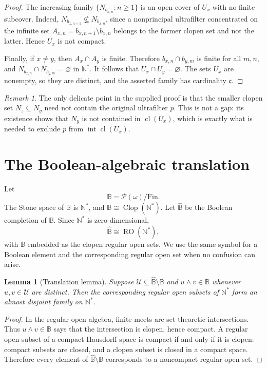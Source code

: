 \documentclass[11pt]{article}
\newtheorem{lemma}[theorem]{Lemma}
\theoremstyle{definition}
\theoremstyle{remark}
\newtheorem{remark}[theorem]{Remark}
\newcommand{\B}{\mathbb B}
\newcommand{\wideB}{\widehat{\mathbb B}}
\newcommand{\Fin}{\mathrm{Fin}}
\newcommand{\RO}{\operatorname{RO}}
\newcommand{\Clop}{\operatorname{Clop}}
\newcommand{\Int}{\operatorname{int}}
\newcommand{\cl}{\operatorname{cl}}
\newcommand{\calU}{\mathcal U}
\begin{document}
\begin{proof}
The increasing family \(\{N_{b_{x,n}}:n\geq1\}\) is an open cover of
\(U_x\) with no finite subcover.  Indeed,
\(N_{b_{x,n+1}}\nsubseteq N_{b_{x,n}}\), since a nonprincipal ultrafilter
concentrated on the infinite set
\(A_{x,n}=b_{x,n+1}\setminus b_{x,n}\) belongs to the former clopen set and
not the latter.  Hence \(U_x\) is not compact.

Finally, if \(x\neq y\), then \(A_x\cap A_y\) is finite.  Therefore
\(b_{x,n}\cap b_{y,m}\) is finite for all \(m,n\), and
\(N_{b_{x,n}}\cap N_{b_{y,m}}=\varnothing\) in \(\mathbb N^*\).  It follows
that \(U_x\cap U_y=\varnothing\).  The sets \(U_x\) are nonempty, so they are
distinct, and the asserted family has cardinality \(\mathfrak c\).
\end{proof}

\begin{remark}
The only delicate point in the supplied proof is that the smaller clopen set
\(N_z\subseteq N_y\) need not contain the original ultrafilter \(p\).  This is
not a gap: its existence shows that \(N_y\) is not contained in
\(\cl(U_x)\), which is exactly what is needed to exclude
\(p\) from \(\Int\cl(U_x)\).
\end{remark}

\section{The Boolean-algebraic translation}

Let
\[
  \B=\mathcal P(\omega)/\Fin.
\]
The Stone space of \(\B\) is \(\mathbb N^*\), and
\(\B\cong\Clop(\mathbb N^*)\).  Let \(\wideB\) be the Boolean completion of
\(\B\).  Since \(\mathbb N^*\) is zero-dimensional,
\[
  \wideB\cong\RO(\mathbb N^*),
\]
with \(\B\) embedded as the clopen regular open sets.  We use the same symbol
for a Boolean element and the corresponding regular open set when no confusion
can arise.

\begin{lemma}[Translation lemma]\label{lem:translation}
Suppose \(\calU\subseteq\wideB\setminus\B\) and
\(u\wedge v\in\B\) whenever \(u,v\in\calU\) are distinct.  Then the
corresponding regular open subsets of \(\mathbb N^*\) form an almost disjoint
family on \(\mathbb N^*\).
\end{lemma}

\begin{proof}
In the regular-open algebra, finite meets are set-theoretic intersections.
Thus \(u\wedge v\in\B\) says that the intersection is clopen, hence compact.
A regular open subset of a compact Hausdorff space is compact if and only if it
is clopen: compact subsets are closed, and a clopen subset is closed in a
compact space.  Therefore every element of \(\wideB\setminus\B\) corresponds
to a noncompact regular open set.
\end{proof}
\end{document}
